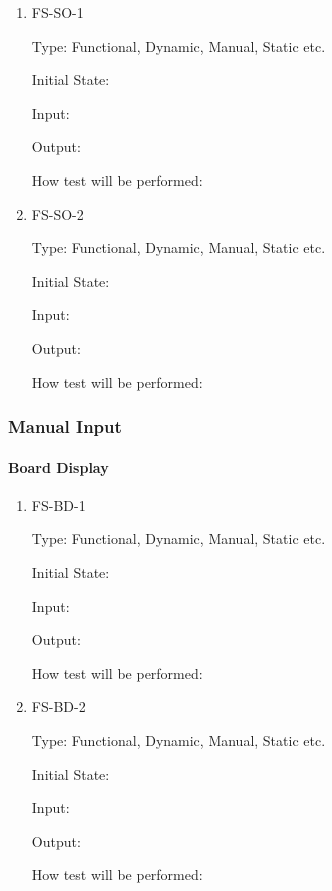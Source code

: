\documentclass[11pt]{article}
\begin{document}
\begin{enumerate}

\item{FS-SO-1\\}

Type: Functional, Dynamic, Manual, Static etc.
					
Initial State: 
					
Input: 
					
Output: 
					
How test will be performed: 
					
\item{FS-SO-2\\}

Type: Functional, Dynamic, Manual, Static etc.
					
Initial State: 
					
Input: 
					
Output: 
					
How test will be performed: 

\end{enumerate}

\subsubsection{Manual Input}

\paragraph{Board Display}

\begin{enumerate}

\item{FS-BD-1\\}

Type: Functional, Dynamic, Manual, Static etc.
					
Initial State: 
					
Input: 
					
Output: 
					
How test will be performed: 
					
\item{FS-BD-2\\}

Type: Functional, Dynamic, Manual, Static etc.
					
Initial State: 
					
Input: 
					
Output: 
					
How test will be performed: 

\end{enumerate}
\end{document}
